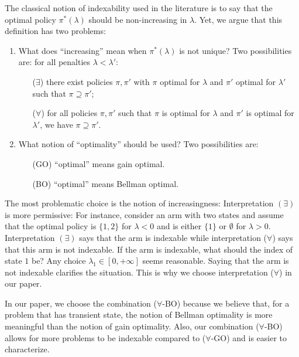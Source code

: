 The classical notion of indexability used in the literature is to say that the optimal policy $\pi^*(\lambda)$ should be non-increasing in $\lambda$. Yet, we argue that this definition has two problems:
\begin{enumerate}
    \item What does ``increasing'' mean when $\pi^*(\lambda)$ is not unique? Two possibilities are: for all penalties $\lambda<\lambda'$:
    \begin{enumerate}
        \item[($\exists$)] there exist policies $\pi,\pi'$ with $\pi$ optimal for $\lambda$ and $\pi'$ optimal for $\lambda'$ such that $\pi\supseteq\pi'$;
        \item[($\forall$)] for all policies $\pi,\pi'$ such that  $\pi$ is optimal for $\lambda$ and $\pi'$ is optimal for $\lambda'$, we have $\pi\supseteq\pi'$.
    \end{enumerate}
    \item What notion of ``optimality'' should be used? Two possibilities are: 
    \begin{enumerate}
       \item[(GO)] ``optimal'' means gain optimal.
       \item[(BO)] ``optimal'' means Bellman optimal.
   \end{enumerate}
\end{enumerate}
The most problematic choice is the notion of increasingness: Interpretation $(\exists)$ is more permissive: For instance, consider an arm with two states and assume that the optimal policy is $\{1,2\}$ for $\lambda<0$ and is either $\{1\}$ or $\emptyset$ for $\lambda>0$. Interpretation $(\exists)$ says that the arm is indexable while interpretation ($\forall$) says that this arm is not indexable. If the arm is indexable, what should the index of state $1$ be? Any choice $\lambda_1\in[0,+\infty]$ seems reasonable. Saying that the arm is not indexable clarifies the situation. This is why we choose interpretation ($\forall$) in our paper.

In our paper, we choose the combination ($\forall$-BO) because we believe that, for a problem that has transient state, the notion of Bellman optimality is more meaningful than the notion of gain optimality. Also, our combination ($\forall$-BO) allows for more problems to be indexable compared to ($\forall$-GO) and is easier to characterize.


